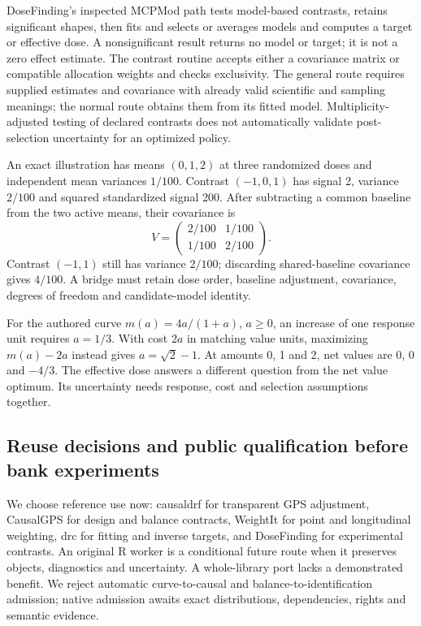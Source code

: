 DoseFinding's inspected MCPMod path tests model-based contrasts, retains
significant shapes, then fits and selects or averages models and computes a
target or effective dose. A nonsignificant result returns no model or target;
it is not a zero effect estimate. The contrast routine accepts either a
covariance matrix or compatible allocation weights and checks exclusivity.
The general route requires supplied estimates and covariance with already
valid scientific and sampling meanings; the normal route obtains them from
its fitted model. Multiplicity-adjusted testing of declared contrasts does not
automatically validate post-selection uncertainty for an optimized policy.
\citep{exec24_dose_dosefinding}

An exact illustration has means $(0,1,2)$ at three randomized doses and
independent mean variances $1/100$. Contrast $(-1,0,1)$ has signal 2, variance
$2/100$ and squared standardized signal 200. After subtracting a common
baseline from the two active means, their covariance is
\[
 V=\begin{pmatrix}2/100&1/100\\1/100&2/100\end{pmatrix}.
\]
Contrast $(-1,1)$ still has variance $2/100$; discarding shared-baseline
covariance gives $4/100$. A bridge must retain dose order, baseline adjustment,
covariance, degrees of freedom and candidate-model identity.
\citep{exec24_dose_contract}

For the authored curve $m(a)=4a/(1+a)$, $a\geq0$, an increase of one response
unit requires $a=1/3$. With cost $2a$ in matching value units, maximizing
$m(a)-2a$ instead gives $a=\sqrt2-1$. At amounts 0, 1 and 2, net values are
0, 0 and $-4/3$. The effective dose answers a different question from the net
value optimum. Its uncertainty needs response, cost and selection assumptions
together.~\citep{exec24_dose_contract}

\subsection{Reuse decisions and public qualification before bank experiments}
We choose reference use now: causaldrf for transparent GPS adjustment,
CausalGPS for design and balance contracts, WeightIt for point and longitudinal
weighting, drc for fitting and inverse targets, and DoseFinding for experimental
contrasts. An original R worker is a conditional future route when it preserves
objects, diagnostics and uncertainty. A whole-library port lacks a demonstrated
benefit. We reject automatic curve-to-causal and balance-to-identification
admission; native admission awaits exact distributions, dependencies, rights
and semantic evidence.~\citep{exec24_dose_contract}

